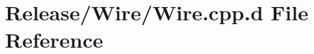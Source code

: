 \hypertarget{_release_2_wire_2_wire_8cpp_8d}{\section{\-Release/\-Wire/\-Wire.cpp.\-d \-File \-Reference}
\label{_release_2_wire_2_wire_8cpp_8d}
}
